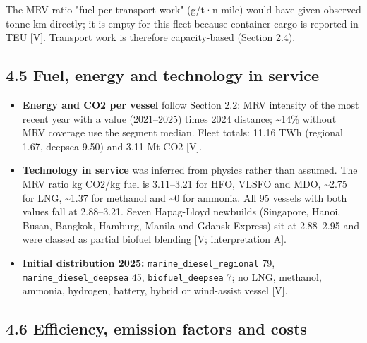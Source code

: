 \documentclass[11pt,a4paper]{article}
\begin{document}
The MRV ratio "fuel per transport work" (g/t·n mile) would have given observed tonne-km directly; it is empty for this fleet because container cargo is reported in TEU [V]. Transport work is therefore capacity-based (Section 2.4).

\subsection*{4.5 Fuel, energy and technology in service}

\begin{itemize}
\item{} \textbf{Energy and CO2 per vessel} follow Section 2.2: MRV intensity of the most recent year with a value (2021–2025) times 2024 distance; \textasciitilde{}14\% without MRV coverage use the segment median. Fleet totals: 11.16 TWh (regional 1.67, deepsea 9.50) and 3.11 Mt CO2 [V].
\item{} \textbf{Technology in service} was inferred from physics rather than assumed. The MRV ratio kg CO2/kg fuel is 3.11–3.21 for HFO, VLSFO and MDO, \textasciitilde{}2.75 for LNG, \textasciitilde{}1.37 for methanol and \textasciitilde{}0 for ammonia. All 95 vessels with both values fall at 2.88–3.21. Seven Hapag-Lloyd newbuilds (Singapore, Hanoi, Busan, Bangkok, Hamburg, Manila and Gdansk Express) sit at 2.88–2.95 and were classed as partial biofuel blending [V; interpretation A].
\item{} \textbf{Initial distribution 2025:} \texttt{marine\_\allowbreak{}diesel\_\allowbreak{}regional} 79, \texttt{marine\_\allowbreak{}diesel\_\allowbreak{}deepsea} 45, \texttt{biofuel\_\allowbreak{}deepsea} 7; no LNG, methanol, ammonia, hydrogen, battery, hybrid or wind-assist vessel [V].
\end{itemize}

\subsection*{4.6 Efficiency, emission factors and costs}
\end{document}
